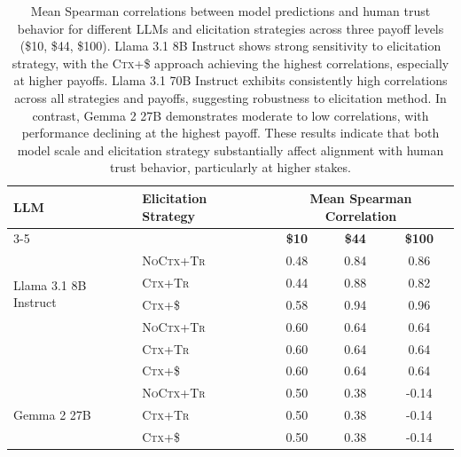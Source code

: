 \begin{table}[htpb]
    \centering
    \small
    \begin{tabular}{llccc}
        \toprule
        \textbf{LLM} & \textbf{Elicitation Strategy} & \multicolumn{3}{c}{\textbf{Mean Spearman Correlation}} \\
        \cmidrule(lr){3-5}
        & & \textbf{\$10} & \textbf{\$44} & \textbf{\$100} \\
        \midrule
        \multirow{4}{*}{Llama 3.1 8B Instruct}
            & \textsc{NoCtx+Tr}      & 0.48 & 0.84 & 0.86 \\
            & \textsc{Ctx+Tr} & 0.44 & 0.88 & 0.82 \\
            & \textsc{Ctx+\$}       & 0.58 & 0.94 & 0.96 \\
        \midrule
        \multirow{4}{*}{Llama 3.1 70B Instruct}
            & \textsc{NoCtx+Tr}      & 0.60 & 0.64 & 0.64 \\
            & \textsc{Ctx+Tr} & 0.60 & 0.64 & 0.64 \\
            & \textsc{Ctx+\$}       & 0.60 & 0.64 & 0.64 \\
        \midrule
        \multirow{4}{*}{Gemma 2 27B}
            & \textsc{NoCtx+Tr}      & 0.50 & 0.38 & -0.14 \\
            & \textsc{Ctx+Tr} & 0.50 & 0.38 & -0.14 \\
            & \textsc{Ctx+\$}        & 0.50 & 0.38 & -0.14 \\
        \bottomrule
    \end{tabular}
    \caption{Mean Spearman correlations between model predictions and human trust behavior for different LLMs and elicitation strategies across three payoff levels (\$10, \$44, \$100). Llama 3.1 8B Instruct shows strong sensitivity to elicitation strategy, with the \textsc{Ctx+\$} approach achieving the highest correlations, especially at higher payoffs. Llama 3.1 70B Instruct exhibits consistently high correlations across all strategies and payoffs, suggesting robustness to elicitation method. In contrast, Gemma 2 27B demonstrates moderate to low correlations, with performance declining at the highest payoff. These results indicate that both model scale and elicitation strategy substantially affect alignment with human trust behavior, particularly at higher stakes.}
    \label{tab:ablation-payoff}
\end{table}